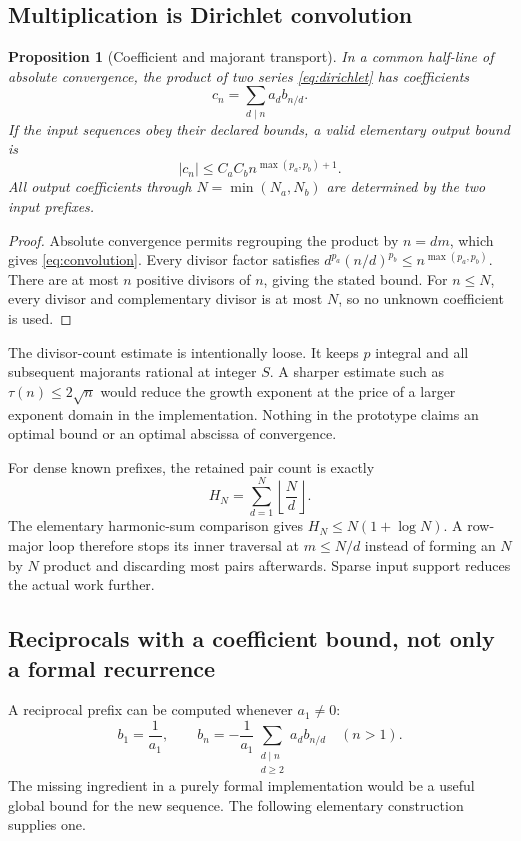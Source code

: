 \documentclass[11pt,letterpaper]{article}
\newtheorem{proposition}{Proposition}[section]
\begin{document}
\subsection{Multiplication is Dirichlet convolution}
\begin{proposition}[Coefficient and majorant transport]\label{prop:product}
In a common half-line of absolute convergence, the product of two series
\eqref{eq:dirichlet} has coefficients
\begin{equation}\label{eq:convolution}
 c_n=\sum_{d\mid n}a_d b_{n/d}.
\end{equation}
If the input sequences obey their declared bounds, a valid elementary output
bound is
\begin{equation}
 |c_n|\leq C_aC_b n^{\max(p_a,p_b)+1}.
\end{equation}
All output coefficients through $N=\min(N_a,N_b)$ are determined by the two
input prefixes.
\end{proposition}
\begin{proof}
Absolute convergence permits regrouping the product by $n=dm$, which gives
\eqref{eq:convolution}. Every divisor factor satisfies
$d^{p_a}(n/d)^{p_b}\leq n^{\max(p_a,p_b)}$. There are at most $n$ positive
divisors of $n$, giving the stated bound. For $n\leq N$, every divisor and
complementary divisor is at most $N$, so no unknown coefficient is used.
\end{proof}

The divisor-count estimate is intentionally loose. It keeps $p$ integral and
all subsequent majorants rational at integer $S$. A sharper estimate such as
$\tau(n)\leq2\sqrt n$ would reduce the growth exponent at the price of a
larger exponent domain in the implementation. Nothing in the prototype claims
an optimal bound or an optimal abscissa of convergence.

For dense known prefixes, the retained pair count is exactly
\begin{equation}\label{eq:pairs}
 H_N=\sum_{d=1}^{N}\left\lfloor\frac Nd\right\rfloor.
\end{equation}
The elementary harmonic-sum comparison gives $H_N\leq N(1+\log N)$.
A row-major loop therefore stops its inner traversal at $m\leq N/d$ instead of
forming an $N$ by $N$ product and discarding most pairs afterwards. Sparse input
support reduces the actual work further.

\subsection{Reciprocals with a coefficient bound, not only a formal recurrence}
A reciprocal prefix can be computed whenever $a_1\ne0$:
\begin{equation}\label{eq:recurrence}
 b_1=\frac1{a_1},\qquad
 b_n=-\frac1{a_1}\sum_{\substack{d\mid n\\d\geq2}}a_d b_{n/d}
 \quad(n>1).
\end{equation}
The missing ingredient in a purely formal implementation would be a useful
global bound for the new sequence. The following elementary construction
supplies one.
\end{document}
